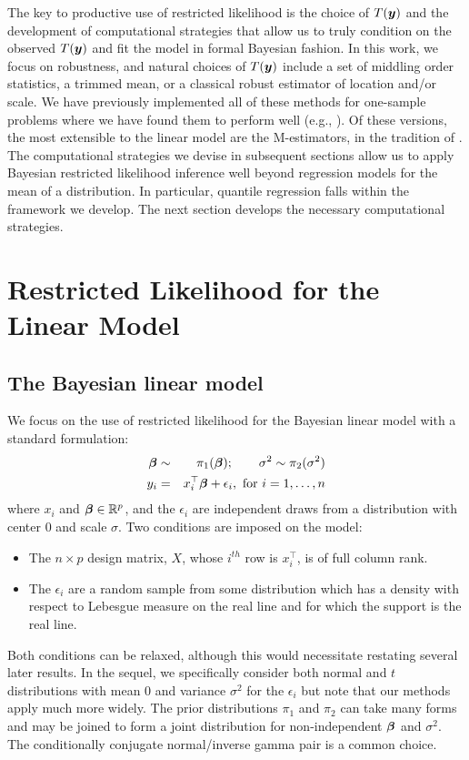 \documentclass[12pt]{article}
\makeatletter
\def\bbeta{\mbox{\boldmath $\beta$}}
\newcommand{\by}{\mbox{\boldmath $y$}}
\newcommand{\labitem}[2]{%
\def\@itemlabel{\textbf{#1}{.}}
\item
\def\@currentlabel{#1}\label{#2}}
\makeatother
\begin{document}
The key to productive use of restricted likelihood is the choice of $T(\by)$ and the development
of computational strategies that allow us to truly condition on the observed $T(\by)$ and 
fit the model in formal Bayesian fashion.  In this work, we focus
on robustness, and natural choices of $T(\by)$ include a set of middling order statistics, a trimmed
mean, or a classical robust estimator of location and/or scale.  
We have previously implemented all of these methods for one-sample problems 
where we have found them to perform well (e.g., \cite{lewis2012}).  Of these versions, the most 
extensible to the linear model are the
M-estimators, 
in the tradition of \cite{huber1964}.  
The computational strategies we devise in subsequent sections allow us to apply Bayesian
restricted likelihood inference well beyond regression models for the mean of a distribution.  In particular, 
quantile regression falls within the framework we develop.
The next section develops the necessary computational
strategies.  


\section{Restricted Likelihood for the Linear Model}
\label{BayesLinMod}

\subsection{The Bayesian linear model}
We focus on the use of restricted likelihood for the Bayesian linear
model with a standard formulation: 
\begin{eqnarray}
\label{LinearModel}
\bbeta & \sim & \pi_1(\bbeta); \qquad \sigma^2  \sim  \pi_2(\sigma^2)
\nonumber\\
y_i  & =  & x_i^\top \bbeta + \epsilon_i , \mbox{ for } i = 1, \ldots, n 
\end{eqnarray}
where $x_i$ and $\bbeta \in \mathbb{R}^p$, 
and the $\epsilon_i$ are independent 
draws from a distribution with center $0$ and scale $\sigma$.
Two conditions are imposed on the model:
\begin{itemize}
\labitem{C1}{fullRank} The $n \times p$ design matrix, $X$, whose $i^{th}$ row is $x_i^\top$, 
is of full column rank.  
\labitem{C2}{supReal} The $\epsilon_i$ are a random sample from some distribution which has a density with 
respect to Lebesgue measure on the real line and for which the support is the real line.  
\end{itemize}
Both conditions can
be relaxed, although this would necessitate restating several later results.  
In the sequel, we specifically consider both normal and $t$ distributions with
mean $0$ and variance $\sigma^2$ for the $\epsilon_i$ 
but note that our methods apply much more widely.  The prior distributions $\pi_1$ and $\pi_2$ can take
many forms and may be joined to form a joint distribution for non-independent $\bbeta$
and $\sigma^2$.  The conditionally conjugate normal/inverse gamma pair is a common 
choice.  
\end{document}
